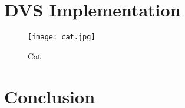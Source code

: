 \section{DVS Implementation}
\begin{figure}
	\centering
	\texttt{[image: cat.jpg]}
	\caption{Cat}
\end{figure}
\section{Conclusion}